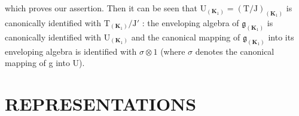 which proves our assertion. Then it can be seen that \(\mathrm{U}_{(\mathbf{K}_{1})} = (\mathrm{T}/\mathrm{J})_{(\mathbf{K}_{1})}\) is canonically identified with \(\mathrm{T}_{(\mathbf{K}_{1})}/\mathrm{J}'\) : the enveloping algebra of \(\mathfrak{g}_{(\mathbf{K}_{1})}\) is canonically identified with \(\mathrm{U}_{(\mathbf{K}_{1})}\) and the canonical mapping of \(\mathfrak{g}_{(\mathbf{K}_{1})}\) into its enveloping algebra is identified with \(\sigma \otimes 1\) (where \(\sigma\) denotes the canonical mapping of g into U).

\section{REPRESENTATIONS}

